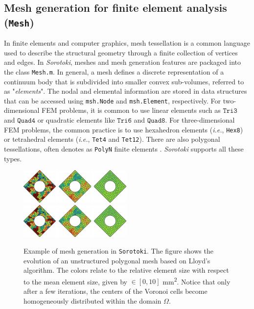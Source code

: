\subsection{Mesh generation for finite element analysis (\texttt{Mesh})}
\label{sec:C5:mesh}
In finite elements and computer graphics, mesh tessellation is a common language used to describe the structural geometry through a finite collection of vertices and edges. In \textit{Sorotoki}, meshes and mesh generation features are packaged into the class \texttt{Mesh.m}. In general, a mesh defines a discrete representation of a continuum body that is subdivided into smaller convex sub-volumes, referred to as "\textit{elements}". The nodal and elemental information are stored in data structures that can be accessed using \texttt{msh.Node} and \texttt{msh.Element}, respectively. For two-dimensional FEM problems, it is common to use linear elements such as $\texttt{Tri3}$ and $\texttt{Quad4}$ or quadratic elements like $\texttt{Tri6}$ and $\texttt{Quad8}$. For three-dimensional FEM problems, the common practice is to use hexahedron elements (\textit{i.e.}, \texttt{Hex8}) or tetrahedral elements (\textit{i.e.}, \texttt{Tet4} and \texttt{Tet12}). There are also polygonal tessellations, often denotes as \texttt{PolyN} finite elements \cite{Talischi2012Mar}. \textit{Sorotoki} supports all these types.
%
\begin{figure}[!t]
    \centering
    \includegraphics*[width=0.495\textwidth]{./pdf/thesis-figure-6-4.pdf}
    \includegraphics*[width=0.495\textwidth]{./pdf/thesis-figure-6-4.pdf}
    \caption{Example of mesh generation in \texttt{Sorotoki}. The figure shows the evolution of an unstructured polygonal mesh based on Lloyd's algorithm. The colors relate to the relative element size with respect to the mean element size, given by \protect{}$\!\!\in [0,10]$ \si{\milli \meter \squared}. Notice that only after a few iterations, the centers of the Voronoi cells become homogeneously distributed within the domain $\Omega$.}
    \label{fig:sorotoki:meshexample}
    \vspace{-3mm}
\end{figure}

